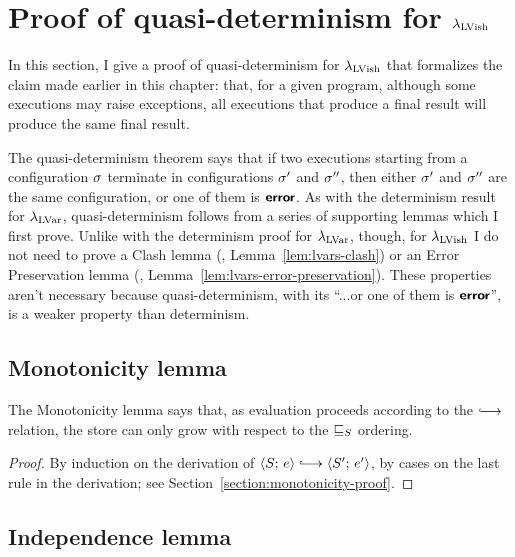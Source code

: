 \section{Proof of quasi-determinism for $\lambda_{\textrm{LVish}}$}\label{s:quasi-proof-of-quasi-determinism}


In this section, I give a proof of quasi-determinism for
$\lambda_{\textrm{LVish}}$ that formalizes the claim made earlier in this chapter:
that, for a given program, although some executions may raise
exceptions, all executions that produce a final result will produce
the same final result.

The quasi-determinism theorem says that if two executions starting
from a configuration $\sigma$ terminate in configurations $\sigma'$ and
$\sigma''$, then either $\sigma'$ and $\sigma''$ are the same
configuration, or one of them is $\textbf{\textsf{error}}$.  As with the determinism
result for $\lambda_{\textrm{LVar}}$, quasi-determinism follows from a series of
supporting lemmas which I first prove.  Unlike with the determinism
proof for $\lambda_{\textrm{LVar}}$, though, for $\lambda_{\textrm{LVish}}$ I do not need to
prove a Clash lemma (\eg, Lemma~\ref{lem:lvars-clash}) or an Error
Preservation lemma (\eg, Lemma~\ref{lem:lvars-error-preservation}).
These properties aren't necessary because quasi-determinism, with its
``...or one of them is $\textbf{\textsf{error}}$'', is a weaker property than
determinism.

\subsection{Monotonicity lemma}\label{subsection:quasi-monotonicity}

The Monotonicity lemma says that, as evaluation proceeds according to
the $\parstepsto$ relation, the store can only grow with respect to
the $ \sqsubseteq_S $ ordering.

\LemMonotonicity
\begin{proof}
  By induction on the derivation of $\config{S}{e} \parstepsto
  \config{S'}{e'}$, by cases on the last rule in the derivation; see
  Section~\ref{section:monotonicity-proof}.
\end{proof}

\subsection{Independence lemma}\label{subsection:quasi-independence}

